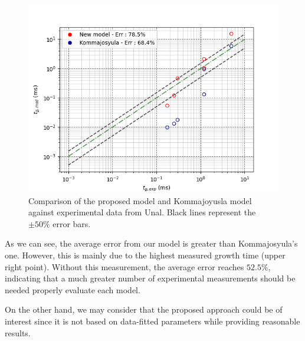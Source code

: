 \begin{figure}[h!]
\centering
\includegraphics[width=0.6\linewidth]{img/tg/comp_tg_unal.png}
\caption{Comparison of the proposed model and Kommajoyusla model against experimental data from Unal. Black lines represent the $\pm 50\%$ error bars.}
\label{fig:comp_modelKomm}
\end{figure}

As we can see, the average error from our model is greater than Kommajosyula's one. However, this is mainly due to the highest measured growth time (upper right point). Without this measurement, the average error reaches $52.5\%$, indicating that a much greater number of experimental measurements should be needed properly evaluate each model.

\npar
On the other hand, we may consider that the proposed approach could be of interest since it is not based on data-fitted parameters while providing reasonable results.



\begin{table}[h!]


\noindent{}


\caption{Bubble growth time data in vertical flow boiling}
\label{tab:tg_exp_data}


\end{table}

